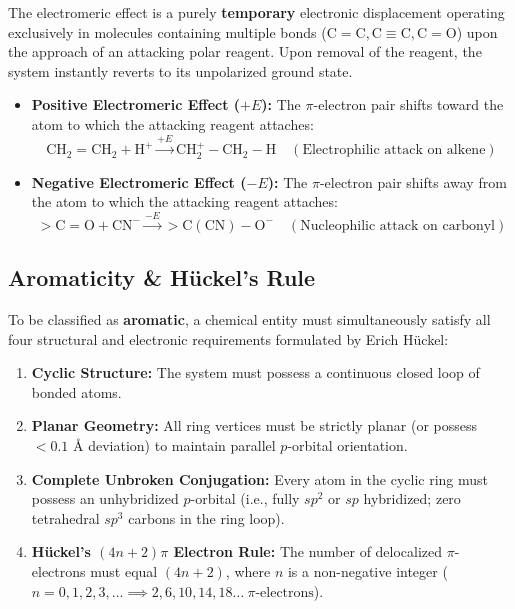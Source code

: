 \documentclass[10pt,twoside,openright]{book}
\begin{document}
\begin{conceptbox}
The electromeric effect is a purely \textbf{temporary} electronic displacement operating exclusively in molecules containing multiple bonds ($\mathrm{C=C}, \mathrm{C\equiv C}, \mathrm{C=O}$) upon the approach of an attacking polar reagent. Upon removal of the reagent, the system instantly reverts to its unpolarized ground state.
\begin{itemize}
  \item \textbf{Positive Electromeric Effect ($+E$):} The $\pi$-electron pair shifts toward the atom to which the attacking reagent attaches:
  \begin{equation}
    \mathrm{CH_2=CH_2} + \mathrm{H^+} \xrightarrow{+E} \mathrm{CH_2^+-CH_2-H} \quad (\text{Electrophilic attack on alkene})
  \end{equation}
  \item \textbf{Negative Electromeric Effect ($-E$):} The $\pi$-electron pair shifts away from the atom to which the attacking reagent attaches:
  \begin{equation}
    >\mathrm{C=O} + \mathrm{CN^-} \xrightarrow{-E} >\mathrm{C(CN)-O^-} \quad (\text{Nucleophilic attack on carbonyl})
  \end{equation}
\end{itemize}
\end{conceptbox}

\subsection{Aromaticity \& Hückel's Rule}

\begin{conceptbox}
To be classified as \textbf{aromatic}, a chemical entity must simultaneously satisfy all four structural and electronic requirements formulated by Erich Hückel:
\begin{enumerate}[leftmargin=*]
  \item \textbf{Cyclic Structure:} The system must possess a continuous closed loop of bonded atoms.
  \item \textbf{Planar Geometry:} All ring vertices must be strictly planar (or possess $< 0.1\text{ \AA}$ deviation) to maintain parallel $p$-orbital orientation.
  \item \textbf{Complete Unbroken Conjugation:} Every atom in the cyclic ring must possess an unhybridized $p$-orbital (i.e., fully $sp^2$ or $sp$ hybridized; zero tetrahedral $sp^3$ carbons in the ring loop).
  \item \textbf{Hückel's $(4n+2)\pi$ Electron Rule:} The number of delocalized $\pi$-electrons must equal $(4n + 2)$, where $n$ is a non-negative integer ($n = 0, 1, 2, 3, \dots \implies 2, 6, 10, 14, 18 \dots \ \pi\text{-electrons}$).
\end{enumerate}
\end{conceptbox}
\end{document}
